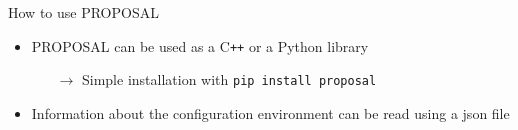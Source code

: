 \documentclass[t]{beamer}
\newlength{\itemseparation}
\begin{document}
  \begin{columns}[onlytextwidth]%
    \begin{column}{0.6\textwidth}%
      \begin{block}{How to use PROPOSAL}%
        \begin{itemize}
          \setlength\itemsep{\itemseparation}
          \item PROPOSAL can be used as a C\texttt{++} or a Python library
            \begin{itemize}
              \setlength\itemsep{\itemseparation}
              \item[$\rightarrow$] Simple installation with \texttt{pip install proposal}
            \end{itemize}
          \item Information about the configuration environment can be read using a json file
        \end{itemize}

        \begin{columns}[onlytextwidth]
        \begin{column}{0.45\textwidth}
        \begin{mdframed}[backgroundcolor=light-gray, roundcorner=10pt,leftmargin=1, rightmargin=1, innerleftmargin=15, innertopmargin=15,innerbottommargin=15, outerlinewidth=1, linecolor=light-gray]

          
          \end{mdframed} 


\end{column}
\end{columns}
\end{block}
\end{column}
\end{columns}
\end{document}
